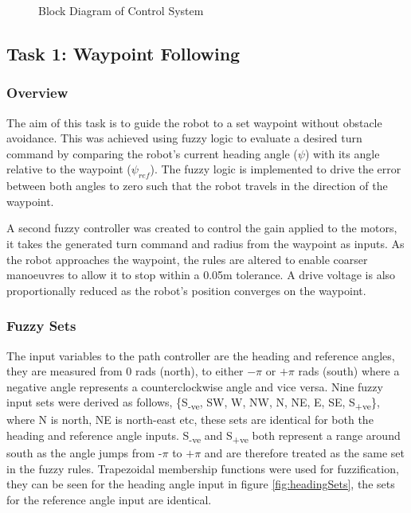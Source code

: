 \documentclass[11pt]{article}
\begin{document}
\begin{figure}[H]
    \centering
    \caption{Block Diagram of Control System}
    \label{fig:system}
\end{figure}



\subsection{Task 1: Waypoint Following}
\subsubsection{Overview}
The aim of this task is to guide the robot to a set waypoint without obstacle avoidance.
This was achieved using fuzzy logic to evaluate a desired turn command by comparing the robot's current heading angle ($\psi$) with its angle relative to the waypoint ($\psi_{ref}$).
The fuzzy logic is implemented to drive the error between both angles to zero such that the robot travels in the direction of the waypoint.
 
\medskip
A second fuzzy controller was created to control the gain applied to the motors, it takes the generated turn command and radius from the waypoint as inputs.
As the robot approaches the waypoint, the rules are altered to enable coarser manoeuvres to allow it to stop within a 0.05m tolerance.
A drive voltage is also proportionally reduced as the robot's position converges on the waypoint. 

\subsubsection{Fuzzy Sets}

The input variables to the path controller are the heading and reference angles, they are measured from 0 rads (north), to either $-\pi$ or $+\pi$ rads (south) where a negative angle represents a counterclockwise angle and vice versa.
Nine fuzzy input sets were derived as follows, \{S\textsubscript{-ve}, SW, W, NW, N, NE, E, SE, S\textsubscript{+ve}\}, where N is north, NE is north-east etc, these sets are identical for both the heading and reference angle inputs.
S\textsubscript{-ve} and S\textsubscript{+ve} both represent a range around south as the angle jumps from -$\pi$ to $+\pi$ and are therefore treated as the same set in the fuzzy rules. 
Trapezoidal membership functions were used for fuzzification, they can be seen for the heading angle input in figure \ref{fig:headingSets}, the sets for the reference angle input are identical.
\end{document}
